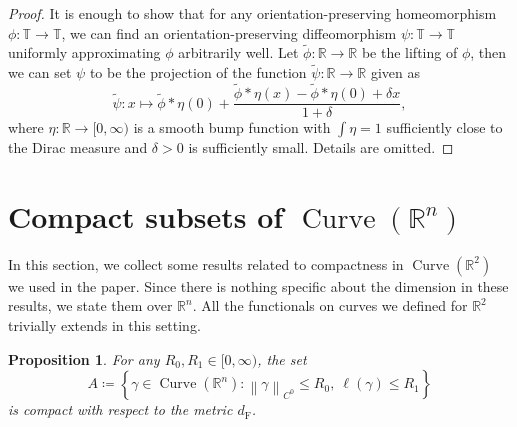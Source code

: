 \documentclass[reqno,centertags,12pt]{amsart}
\newtheorem{proposition}[theorem]{Proposition}
\theoremstyle{definition}
\numberwithin{equation}{section}
\newcommand{\norm}[1]{\left\|#1\right\|}
\newcommand{\setbc}[2]{\left\{ #1\colon#2 \right\}}
\newcommand{\bbR}{{\mathbb{R}}}
\newcommand{\bbT}{{\mathbb{T}}}
\begin{document}
\begin{proof}
    It is enough to show that for any orientation-preserving homeomorphism
    $\phi\colon\bbT\to\bbT$, we can find an orientation-preserving diffeomorphism
    $\psi\colon\bbT\to\bbT$ uniformly approximating $\phi$ arbitrarily well.
    Let $\tilde{\phi}\colon\bbR\to\bbR$ be the lifting of $\phi$, then we can set
    $\psi$ to be the projection of the function $\tilde{\psi}\colon\bbR\to\bbR$ given as
    \[
        \tilde{\psi}\colon x\mapsto
        \tilde{\phi}*\eta(0) +
        \frac{\tilde{\phi}*\eta(x) - \tilde{\phi}*\eta(0) + \delta x}{1+\delta},
    \]
    where $\eta\colon\bbR\to[0,\infty)$ is a smooth bump function with $\int\eta = 1$
    sufficiently close to the Dirac measure and $\delta>0$ is sufficiently small.
    Details are omitted.
\end{proof}


\section{Compact subsets of $\operatorname{Curve}(\bbR^{n})$} \label{SB}

In this section, we collect some results related to compactness
in $\operatorname{Curve}(\bbR^{2})$ we used in the paper.
Since there is nothing specific about the dimension in these results,
we state them over $\bbR^{n}$. All the functionals on curves we defined for $\bbR^{2}$
trivially extends in this setting.

\begin{proposition}\label{PB.1}
    For any $R_{0},R_{1}\in[0,\infty)$, the set
    \[
        A\coloneqq\setbc{\gamma\in\operatorname{Curve}(\bbR^{n})}
        {\norm{\gamma}_{C^{0}} \leq R_{0},\ 
        \ell(\gamma) \leq R_{1}}
    \]
    is compact with respect to the metric $d_{\mathrm{F}}$.
\end{proposition}
\end{document}
